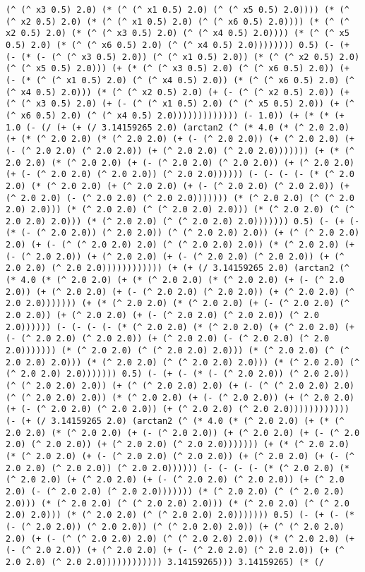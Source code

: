\begin{lstlisting}
(^ (^ x3 0.5) 2.0) (* (^ (^ x1 0.5) 2.0) (^ (^ x5 0.5) 2.0)))) (* (^ (^ x2 0.5) 2.0) (* (^ (^ x1 0.5) 2.0) (^ (^ x6 0.5) 2.0)))) (* (^ (^ x2 0.5) 2.0) (* (^ (^ x3 0.5) 2.0) (^ (^ x4 0.5) 2.0)))) (* (^ (^ x5 0.5) 2.0) (* (^ (^ x6 0.5) 2.0) (^ (^ x4 0.5) 2.0)))))))) 0.5) (- (+ (- (* (- (^ (^ x3 0.5) 2.0)) (^ (^ x1 0.5) 2.0)) (* (^ (^ x2 0.5) 2.0) (^ (^ x5 0.5) 2.0))) (+ (* (^ (^ x3 0.5) 2.0) (^ (^ x6 0.5) 2.0)) (+ (- (* (^ (^ x1 0.5) 2.0) (^ (^ x4 0.5) 2.0)) (* (^ (^ x6 0.5) 2.0) (^ (^ x4 0.5) 2.0))) (* (^ (^ x2 0.5) 2.0) (+ (- (^ (^ x2 0.5) 2.0)) (+ (^ (^ x3 0.5) 2.0) (+ (- (^ (^ x1 0.5) 2.0) (^ (^ x5 0.5) 2.0)) (+ (^ (^ x6 0.5) 2.0) (^ (^ x4 0.5) 2.0))))))))))))) (- 1.0)) (+ (* (* (+ 1.0 (- (/ (+ (+ (/ 3.14159265 2.0) (arctan2 (^ (* 4.0 (* (^ 2.0 2.0) (+ (* (^ 2.0 2.0) (* (^ 2.0 2.0) (+ (- (^ 2.0 2.0)) (+ (^ 2.0 2.0) (+ (- (^ 2.0 2.0) (^ 2.0 2.0)) (+ (^ 2.0 2.0) (^ 2.0 2.0))))))) (+ (* (^ 2.0 2.0) (* (^ 2.0 2.0) (+ (- (^ 2.0 2.0) (^ 2.0 2.0)) (+ (^ 2.0 2.0) (+ (- (^ 2.0 2.0) (^ 2.0 2.0)) (^ 2.0 2.0)))))) (- (- (- (- (* (^ 2.0 2.0) (* (^ 2.0 2.0) (+ (^ 2.0 2.0) (+ (- (^ 2.0 2.0) (^ 2.0 2.0)) (+ (^ 2.0 2.0) (- (^ 2.0 2.0) (^ 2.0 2.0))))))) (* (^ 2.0 2.0) (^ (^ 2.0 2.0) 2.0))) (* (^ 2.0 2.0) (^ (^ 2.0 2.0) 2.0))) (* (^ 2.0 2.0) (^ (^ 2.0 2.0) 2.0))) (* (^ 2.0 2.0) (^ (^ 2.0 2.0) 2.0))))))) 0.5) (- (+ (- (* (- (^ 2.0 2.0)) (^ 2.0 2.0)) (^ (^ 2.0 2.0) 2.0)) (+ (^ (^ 2.0 2.0) 2.0) (+ (- (^ (^ 2.0 2.0) 2.0) (^ (^ 2.0 2.0) 2.0)) (* (^ 2.0 2.0) (+ (- (^ 2.0 2.0)) (+ (^ 2.0 2.0) (+ (- (^ 2.0 2.0) (^ 2.0 2.0)) (+ (^ 2.0 2.0) (^ 2.0 2.0)))))))))))) (+ (+ (/ 3.14159265 2.0) (arctan2 (^ (* 4.0 (* (^ 2.0 2.0) (+ (* (^ 2.0 2.0) (* (^ 2.0 2.0) (+ (- (^ 2.0 2.0)) (+ (^ 2.0 2.0) (+ (- (^ 2.0 2.0) (^ 2.0 2.0)) (+ (^ 2.0 2.0) (^ 2.0 2.0))))))) (+ (* (^ 2.0 2.0) (* (^ 2.0 2.0) (+ (- (^ 2.0 2.0) (^ 2.0 2.0)) (+ (^ 2.0 2.0) (+ (- (^ 2.0 2.0) (^ 2.0 2.0)) (^ 2.0 2.0)))))) (- (- (- (- (* (^ 2.0 2.0) (* (^ 2.0 2.0) (+ (^ 2.0 2.0) (+ (- (^ 2.0 2.0) (^ 2.0 2.0)) (+ (^ 2.0 2.0) (- (^ 2.0 2.0) (^ 2.0 2.0))))))) (* (^ 2.0 2.0) (^ (^ 2.0 2.0) 2.0))) (* (^ 2.0 2.0) (^ (^ 2.0 2.0) 2.0))) (* (^ 2.0 2.0) (^ (^ 2.0 2.0) 2.0))) (* (^ 2.0 2.0) (^ (^ 2.0 2.0) 2.0))))))) 0.5) (- (+ (- (* (- (^ 2.0 2.0)) (^ 2.0 2.0)) (^ (^ 2.0 2.0) 2.0)) (+ (^ (^ 2.0 2.0) 2.0) (+ (- (^ (^ 2.0 2.0) 2.0) (^ (^ 2.0 2.0) 2.0)) (* (^ 2.0 2.0) (+ (- (^ 2.0 2.0)) (+ (^ 2.0 2.0) (+ (- (^ 2.0 2.0) (^ 2.0 2.0)) (+ (^ 2.0 2.0) (^ 2.0 2.0)))))))))))) (- (+ (/ 3.14159265 2.0) (arctan2 (^ (* 4.0 (* (^ 2.0 2.0) (+ (* (^ 2.0 2.0) (* (^ 2.0 2.0) (+ (- (^ 2.0 2.0)) (+ (^ 2.0 2.0) (+ (- (^ 2.0 2.0) (^ 2.0 2.0)) (+ (^ 2.0 2.0) (^ 2.0 2.0))))))) (+ (* (^ 2.0 2.0) (* (^ 2.0 2.0) (+ (- (^ 2.0 2.0) (^ 2.0 2.0)) (+ (^ 2.0 2.0) (+ (- (^ 2.0 2.0) (^ 2.0 2.0)) (^ 2.0 2.0)))))) (- (- (- (- (* (^ 2.0 2.0) (* (^ 2.0 2.0) (+ (^ 2.0 2.0) (+ (- (^ 2.0 2.0) (^ 2.0 2.0)) (+ (^ 2.0 2.0) (- (^ 2.0 2.0) (^ 2.0 2.0))))))) (* (^ 2.0 2.0) (^ (^ 2.0 2.0) 2.0))) (* (^ 2.0 2.0) (^ (^ 2.0 2.0) 2.0))) (* (^ 2.0 2.0) (^ (^ 2.0 2.0) 2.0))) (* (^ 2.0 2.0) (^ (^ 2.0 2.0) 2.0))))))) 0.5) (- (+ (- (* (- (^ 2.0 2.0)) (^ 2.0 2.0)) (^ (^ 2.0 2.0) 2.0)) (+ (^ (^ 2.0 2.0) 2.0) (+ (- (^ (^ 2.0 2.0) 2.0) (^ (^ 2.0 2.0) 2.0)) (* (^ 2.0 2.0) (+ (- (^ 2.0 2.0)) (+ (^ 2.0 2.0) (+ (- (^ 2.0 2.0) (^ 2.0 2.0)) (+ (^ 2.0 2.0) (^ 2.0 2.0)))))))))))) 3.14159265))) 3.14159265) (* (/ 
\end{lstlisting}
